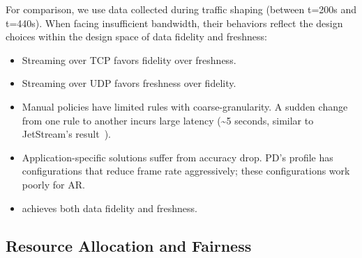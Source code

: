 For comparison, we use data collected during traffic shaping (between t=200s and
t=440s). When facing insufficient bandwidth, their behaviors reflect
the design choices within the design space of data fidelity and freshness:

\begin{itemize}[leftmargin=*, topsep=0pt, itemsep=0pt]
\item Streaming over TCP favors fidelity over freshness.
\item Streaming over UDP favors freshness over fidelity.
\item Manual policies have limited rules with coarse-granularity. A sudden
  change from one rule to another incurs large latency (\textasciitilde 5
  seconds, similar to JetStream's result~\cite{rabkin2014aggregation}).
\item Application-specific solutions suffer from accuracy drop. PD's profile has
  configurations that reduce frame rate aggressively; these configurations work
  poorly for AR\@.
\item \sysname{} achieves both data fidelity and freshness.
\end{itemize}

\subsection{Resource Allocation and Fairness}
\label{sec:multi-task-alloc}

